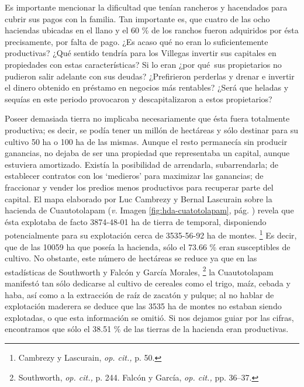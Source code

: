 \documentclass[14pt,twoside,final]{extbook} %
\let\oldfootnote\footnote
\renewcommand\footnote[1]{%
\oldfootnote{\hspace{1mm}#1}}
\begin{document}
Es importante mencionar la dificultad que tenían rancheros y hacendados para cubrir sus pagos con la familia. Tan importante es, que cuatro de las ocho haciendas ubicadas en el llano y el 60 \% de los ranchos fueron adquiridos por ésta precisamente, por falta de pago. ¿Es acaso qué no eran lo suficientemente productivas? ¿Qué sentido tendría para los Villegas invertir sus capitales en propiedades con estas características? Si lo eran ¿por qué~sus propietarios no pudieron salir adelante con sus deudas? ¿Prefirieron perderlas y drenar e invertir el dinero obtenido en préstamo en negocios más rentables? ¿Será que heladas y sequías en este periodo provocaron y descapitalizaron a estos propietarios?

Poseer demasiada tierra no implicaba necesariamente que ésta fuera totalmente productiva; es decir, se podía tener un millón de hectáreas y sólo destinar para su cultivo 50 ha o 100 ha de las mismas. Aunque el resto permanecía sin producir ganancias, no dejaba de ser una propiedad que representaba un capital, aunque estuviera amortizado. Existía la posibilidad de arrendarla, subarrendarla; de establecer contratos con los `medieros' para maximizar las ganancias; de fraccionar y vender los predios menos productivos para recuperar parte del capital. El mapa elaborado por Luc Cambrezy y Bernal Lascurain sobre la hacienda de Cuautotolapam (\emph{v.} Imagen \ref{fig:hda-cuatotolapam}, pág. \pageref{fig:hda-cuatotolapam}) revela que ésta explotaba de facto 3874-48-01 ha de tierra de temporal, disponiendo potencialmente para su explotación cerca de 3535-56-92 ha de montes.\footnote{Cambrezy y Lascurain, \emph{op. cit.,} p. 50.} Es decir, que de las 10059 ha que poseía la hacienda, sólo el 73.66 \% eran susceptibles de cultivo. No obstante, este número de hectáreas se reduce ya que en las estadísticas de Southworth y Falcón y García Morales,\footnote{Southworth, \emph{op. cit.,} p. 244. Falcón y García, \emph{op. cit.,} pp. 36--37.} la Cuautotolapam manifestó tan sólo dedicarse al cultivo de cereales como el trigo, maíz, cebada y haba, así como a la extracción de raíz de zacatón y pulque; al no hablar de explotación maderera se deduce que las 3535 ha de montes no estaban siendo explotadas, o que esta información se omitió. Si nos dejamos guiar por las cifras, encontramos que sólo el 38.51 \% de las tierras de la hacienda eran productivas.
\end{document}

